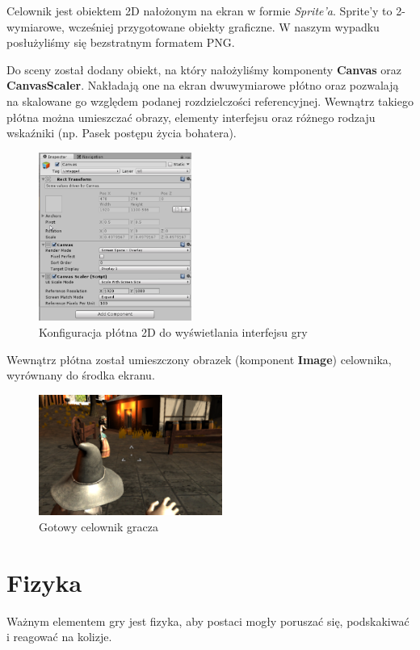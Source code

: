 \documentclass[openright]{xmgr}
\newcommand{\name}[1]{\textbf{\textcolor{NavyBlue}{#1}}}
\begin{document}
      Celownik jest obiektem 2D nałożonym na ekran w formie \textit{Sprite'a}. Sprite'y to 2-wymiarowe, wcześniej przygotowane obiekty graficzne. W naszym wypadku posłużyliśmy się bezstratnym formatem PNG.

      Do sceny został dodany obiekt, na który nałożyliśmy komponenty \name{Canvas} oraz \name{CanvasScaler}. Nakładają one na ekran dwuwymiarowe płótno oraz pozwalają na skalowane go względem podanej rozdzielczości referencyjnej. Wewnątrz takiego płótna można umieszczać obrazy, elementy interfejsu oraz różnego rodzaju wskaźniki (np. Pasek postępu życia bohatera).

      \begin{figure}[H]
      \center
      \includegraphics[width=5cm]{celownik_1.png}
      \caption{Konfiguracja płótna 2D do wyświetlania interfejsu gry}
      \end{figure}

      Wewnątrz płótna został umieszczony obrazek (komponent \name{Image}) celownika, wyrównany do środka ekranu.

      \begin{figure}[H]
      \center
      \includegraphics[width=6cm]{celownik_2.png}
      \caption{Gotowy celownik gracza}
      \end{figure}

  \section{Fizyka}\label{sec:fizyka}

      Ważnym elementem gry jest fizyka, aby postaci mogły poruszać się, podskakiwać i reagować na kolizje.
\end{document}
